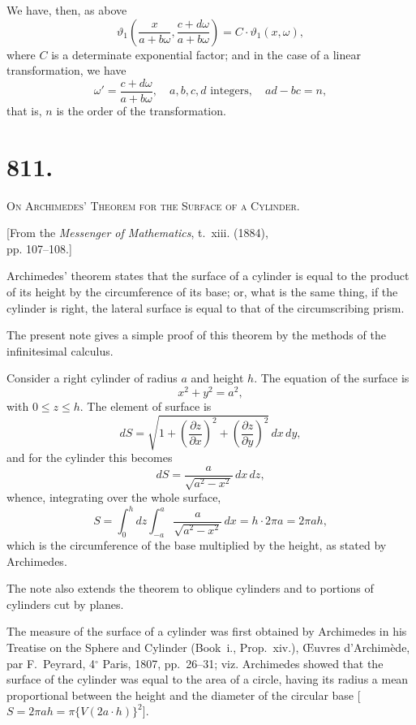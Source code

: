 \documentclass[11pt,a4paper]{article}
\theoremstyle{definition}
\theoremstyle{remark}
\begin{document}
We have, then, as above
\[
\vartheta_1\left(\frac{x}{a+b\omega}, \frac{c+d\omega}{a+b\omega}\right) = C \cdot \vartheta_1(x, \omega),
\]
where $C$ is a determinate exponential factor; and in the case of a linear transformation, we have
\[
\omega' = \frac{c + d\omega}{a + b\omega}, \quad a, b, c, d \text{ integers}, \quad ad - bc = n,
\]
that is, $n$ is the order of the transformation.



\newpage
\section*{811.}
\begin{center}
{\large\scshape On Archimedes' Theorem for the Surface of a Cylinder.}
\end{center}

\begin{flushright}
\small[From the \textit{Messenger of Mathematics}, t.~xiii. (1884),\\
pp. 107--108.]
\end{flushright}

Archimedes' theorem states that the surface of a cylinder is equal to the product of its height by the circumference of its base; or, what is the same thing, if the cylinder is right, the lateral surface is equal to that of the circumscribing prism.

The present note gives a simple proof of this theorem by the methods of the infinitesimal calculus.

Consider a right cylinder of radius $a$ and height $h$. The equation of the surface is
\[
x^2 + y^2 = a^2,
\]
with $0 \leq z \leq h$. The element of surface is
\[
dS = \sqrt{1 + \left(\frac{\partial z}{\partial x}\right)^2 + \left(\frac{\partial z}{\partial y}\right)^2} \, dx \, dy,
\]
and for the cylinder this becomes
\[
dS = \frac{a}{\sqrt{a^2 - x^2}} \, dx \, dz,
\]
whence, integrating over the whole surface,
\[
S = \int_0^h dz \int_{-a}^{a} \frac{a}{\sqrt{a^2 - x^2}} \, dx = h \cdot 2\pi a = 2\pi a h,
\]
which is the circumference of the base multiplied by the height, as stated by Archimedes.

The note also extends the theorem to oblique cylinders and to portions of cylinders cut by planes.

The measure of the surface of a cylinder was first obtained by Archimedes in his Treatise on the Sphere and Cylinder (Book~i., Prop.~xiv.), \OE uvres d'Archim\`ede, par F.~Peyrard, 4$^{\circ}$ Paris, 1807, pp.~26--31; viz. Archimedes showed that the surface of the cylinder was equal to the area of a circle, having its radius a mean proportional between the height and the diameter of the circular base [$S = 2\pi ah = \pi \{V(2a \cdot h)\}^2$].
\end{document}
